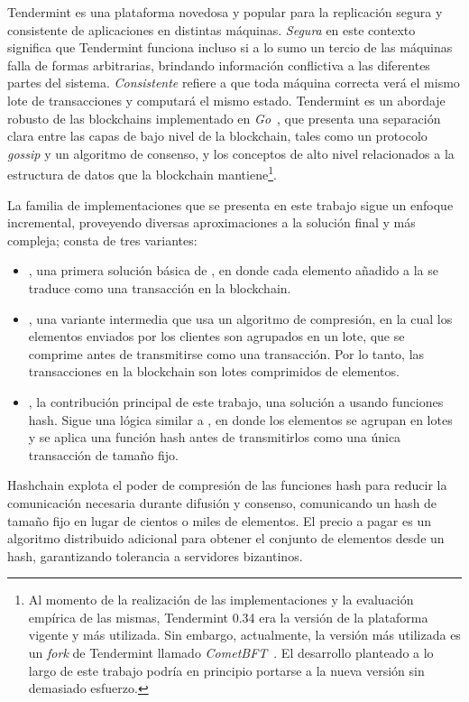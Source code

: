 Tendermint es una plataforma novedosa y popular para la
replicación segura y consistente de aplicaciones en distintas máquinas.
%
\textit{Segura} en este contexto significa que Tendermint funciona incluso si a lo sumo
un tercio de las máquinas falla de formas arbitrarias, brindando información conflictiva
a las diferentes partes del sistema.
%
\textit{Consistente} refiere a que toda máquina correcta verá el mismo lote de
transacciones y computará el mismo estado.
%
Tendermint es un abordaje robusto de las blockchains implementado
en \emph{Go}~\cite{donovan15go}, que presenta una separación clara entre las
capas de bajo nivel de la blockchain,
tales como un protocolo \textit{gossip} y un algoritmo de consenso, y los conceptos de alto
nivel relacionados a la estructura de datos que la blockchain mantiene\footnote{Al momento
de la realización de las implementaciones y la evaluación empírica de las mismas,
Tendermint 0.34 era la versión de la plataforma vigente y más utilizada. Sin embargo,
actualmente, la versión más utilizada es un \textit{fork} de Tendermint llamado \textit{CometBFT}~\cite{cometbft.repo}.
El desarrollo planteado a lo largo de este trabajo podría en principio portarse a la nueva versión sin demasiado esfuerzo.}.

%
%

La familia de implementaciones que se presenta en este trabajo
sigue un enfoque incremental, proveyendo diversas aproximaciones
a la solución final y más compleja; consta de tres variantes:
\begin{itemize}
  \item \textit{\vanilla}, una primera solución básica de \setchain, en donde cada elemento añadido
  a la \setchain se traduce como una transacción en la blockchain.
  \item \textit{\compresschain}, una variante intermedia que usa un algoritmo de compresión,
  en la cual los elementos enviados por los clientes son agrupados en un lote, que se comprime antes
  de transmitirse como una transacción. Por lo tanto, las transacciones en la blockchain son
  lotes comprimidos de elementos.
  \item \textit{\hashchain}, la contribución principal de este trabajo, una solución 
  a \setchain usando funciones hash. Sigue una lógica similar a \compresschain,
  en donde los elementos se agrupan en lotes y se aplica una función hash antes de transmitirlos
  como una única transacción de tamaño fijo.
\end{itemize}
%
Hashchain explota el poder de compresión de las funciones hash para reducir la
comunicación necesaria durante difusión y consenso, comunicando un hash de tamaño
fijo en lugar de cientos o miles de elementos.
%
El precio a pagar es un algoritmo distribuido adicional para obtener el conjunto de
elementos desde un hash, garantizando tolerancia a servidores bizantinos.
%

